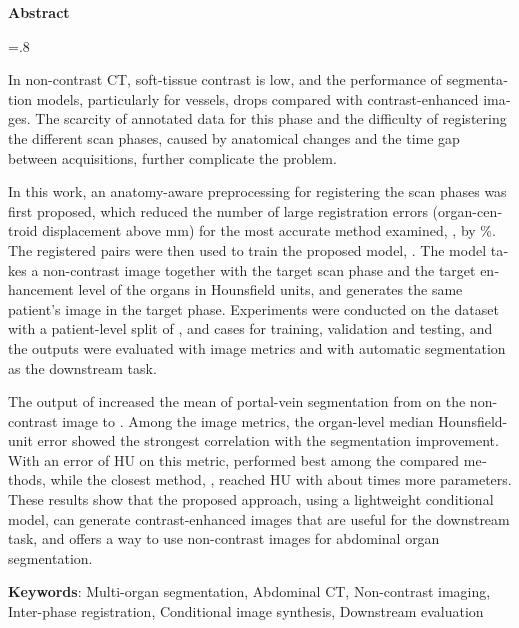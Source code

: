 
\begin{latin}

\begin{center}
\textbf{Abstract}
\end{center}
\baselineskip=.8\baselineskip

In non-contrast CT, soft-tissue contrast is low, and the performance of segmentation models, particularly for vessels, drops compared with contrast-enhanced images. The scarcity of annotated data for this phase and the difficulty of registering the different scan phases, caused by anatomical changes and the time gap between acquisitions, further complicate the problem.

In this work, an anatomy-aware preprocessing for registering the scan phases was first proposed, which reduced the number of large registration errors (organ-centroid displacement above  mm) for the most accurate method examined, , by \%. The registered pairs were then used to train the proposed model, . The model takes a non-contrast image together with the target scan phase and the target enhancement level of the organs in Hounsfield units, and generates the same patient's image in the target phase. Experiments were conducted on the  dataset with a patient-level split of ,  and  cases for training, validation and testing, and the outputs were evaluated with image metrics and with automatic segmentation as the downstream task.

The output of  increased the mean  of portal-vein segmentation from  on the non-contrast image to . Among the image metrics, the organ-level median Hounsfield-unit error showed the strongest correlation with the segmentation improvement. With an error of  HU on this metric,  performed best among the compared methods, while the closest method, , reached  HU with about  times more parameters. These results show that the proposed approach, using a lightweight conditional model, can generate contrast-enhanced images that are useful for the downstream task, and offers a way to use non-contrast images for abdominal organ segmentation.

\bigskip\noindent\textbf{Keywords}:
Multi-organ segmentation, Abdominal CT, Non-contrast imaging, Inter-phase
registration, Conditional image synthesis, Downstream evaluation

\end{latin}
